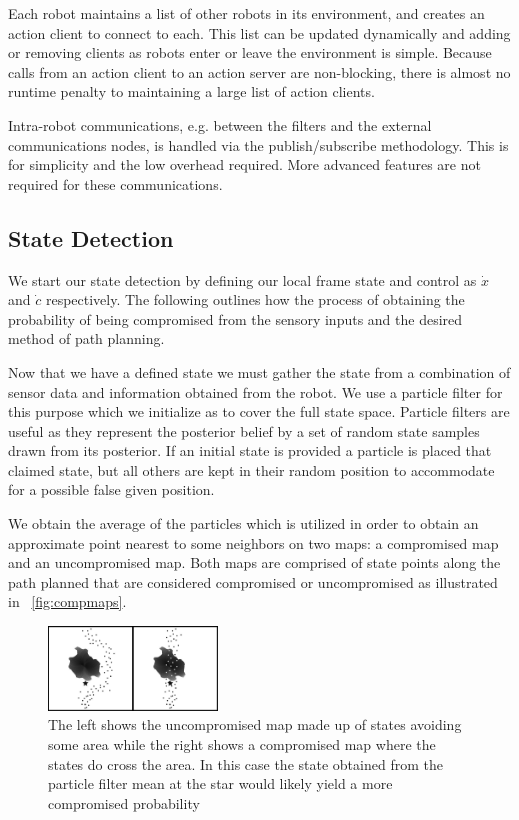 \documentclass[conference]{IEEEtran}
\begin{document}
Each robot maintains a list of other robots in its environment, and creates an action client to connect to each. This list can be updated dynamically and adding or removing clients as robots enter or leave the environment is simple. Because calls from an action client to an action server are non-blocking, there is almost no runtime penalty to maintaining a large list of action clients.

Intra-robot communications, e.g. between the filters and the external communications nodes, is handled via the publish/subscribe methodology. This is for simplicity and the low overhead required. More advanced features are not required for these communications.

\subsection{State Detection}

We start our state detection by defining our local frame state and control as $\dot{x}$ and $\dot{c}$ respectively. The following outlines how the process of obtaining the probability of being compromised from the sensory inputs and the desired method of path planning.

Now that we have a defined state we must gather the state from a combination of sensor data and information obtained from the robot. We use a particle filter for this purpose which we initialize as to cover the full state space. Particle filters are useful as they represent the posterior belief by a set of random state samples drawn from its posterior\cite{Thrun2002Probabilistic}. If an initial state is provided a particle is placed that claimed state, but all others are kept in their random position to accommodate for a possible false given position.
	
We obtain the average of the particles  which is utilized in order to obtain an approximate point nearest to some neighbors on two maps: a compromised map and an uncompromised map. Both maps are comprised of state points along the path planned that are considered compromised or uncompromised as illustrated in ~\autoref{fig:compmaps}.
	
\begin{figure}[]
\centering
\includegraphics[width=0.4\textwidth]{Path_comp}
\caption{The left shows the uncompromised map made up of states avoiding some area while the right shows a compromised map where the states do cross the area. In this case the state obtained from the particle filter mean at the star would likely yield a more compromised probability}
\label{fig:compmaps}
\end{figure}
	
\end{document}
